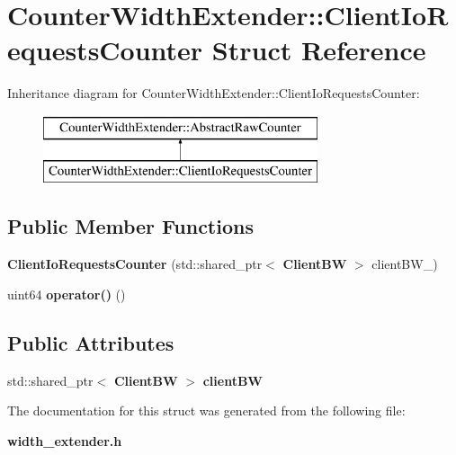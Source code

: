 \section{Counter\+Width\+Extender\+:\+:Client\+Io\+Requests\+Counter Struct Reference}
\label{structCounterWidthExtender_1_1ClientIoRequestsCounter}
Inheritance diagram for Counter\+Width\+Extender\+:\+:Client\+Io\+Requests\+Counter\+:\begin{figure}[H]
\begin{center}
\leavevmode
\includegraphics[height=2.000000cm]{structCounterWidthExtender_1_1ClientIoRequestsCounter}
\end{center}
\end{figure}
\subsection*{Public Member Functions}
\begin{DoxyCompactItemize}
\item 
\mbox{\label{structCounterWidthExtender_1_1ClientIoRequestsCounter_ab3e30c3abdcbd4606e8bb86749abed85}} 
{\bfseries Client\+Io\+Requests\+Counter} (std\+::shared\+\_\+ptr$<$ \textbf{ Client\+BW} $>$ client\+B\+W\+\_\+)
\item 
\mbox{\label{structCounterWidthExtender_1_1ClientIoRequestsCounter_a13cfbc3fedce8d039b306c303f485ff8}} 
uint64 {\bfseries operator()} ()
\end{DoxyCompactItemize}
\subsection*{Public Attributes}
\begin{DoxyCompactItemize}
\item 
\mbox{\label{structCounterWidthExtender_1_1ClientIoRequestsCounter_a00d1a9c0c690843010b82d59fe1ab0b2}} 
std\+::shared\+\_\+ptr$<$ \textbf{ Client\+BW} $>$ {\bfseries client\+BW}
\end{DoxyCompactItemize}


The documentation for this struct was generated from the following file\+:\begin{DoxyCompactItemize}
\item 
\textbf{ width\+\_\+extender.\+h}\end{DoxyCompactItemize}
